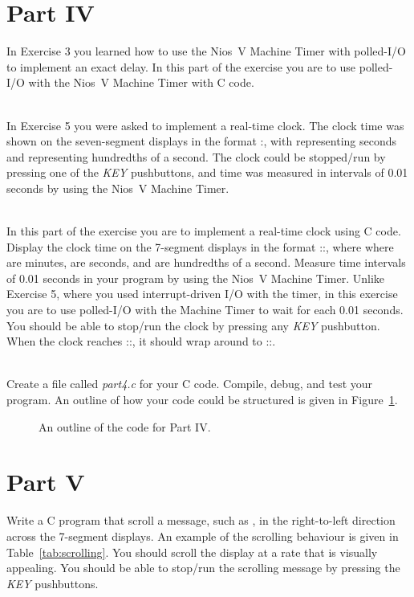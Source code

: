 \documentclass[epsfig,10pt,fullpage]{article}
\begin{document}
\section*{Part IV}
In Exercise 3 you learned how to use the Nios~V Machine Timer with polled-I/O 
to implement an exact delay.  In this part of the exercise you are to use polled-I/O with
the Nios~V Machine Timer with C code. 

~\\
In Exercise 5 you were asked to implement a real-time clock.
The clock time was shown on the  seven-segment displays in the 
format :, with  representing seconds and  
representing hundredths of a second. 
The clock could be stopped/run by pressing one of the {\it KEY} pushbuttons, and
time was measured in intervals of 0.01 seconds by using the Nios~V Machine Timer.

~\\
In this part of the exercise you are to implement a real-time clock using C code. 
Display the clock time on the 7-segment displays 
in the format ::, where 
where  are minutes,  are seconds, and  are hundredths of 
a second.  Measure time intervals of 0.01 seconds in your program by using the 
Nios~V Machine Timer.  Unlike Exercise 5, where you used interrupt-driven I/O with the timer, in
this exercise you are to use polled-I/O with the Machine Timer to wait for each 0.01
seconds. You should be able to stop/run the clock by pressing any {\it KEY} pushbutton.
When the clock reaches ::, it should wrap around to
::.

~\\
Create a file called {\it part4.c} for your C code. Compile, debug, and test your program. 
An outline of how your code could be structured is given in Figure~\ref{fig:outlineIV}.

\begin{figure}[H]
\begin{center}
\begin{minipage}[h]{15.5 cm}

\caption{An outline of the code for Part IV.}
\label{fig:outlineIV}
\end{minipage}
\end{center}
\end{figure}

\section*{Part V}
Write a C program that scroll a message, such as ,
in the right-to-left direction across the 7-segment displays.
An example of the scrolling behaviour is given in Table~\ref{tab:scrolling}.
You should scroll the display at a rate that is visually appealing. You should be 
able to stop/run the scrolling
message by pressing the {\it KEY} pushbuttons.
\end{document}
